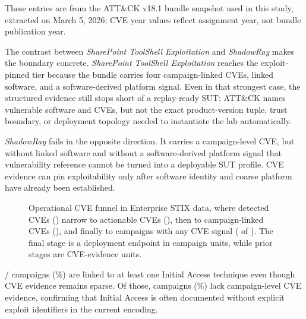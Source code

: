 \documentclass[sigconf]{acmart}
\begin{document}
These entries are from the ATT\&CK v18.1 bundle snapshot used in this study, extracted on March 5, 2026; CVE year values reflect assignment year, not bundle publication year.

The contrast between \emph{SharePoint ToolShell Exploitation} and \emph{ShadowRay} makes the boundary concrete. \emph{SharePoint ToolShell Exploitation} reaches the exploit-pinned tier because the bundle carries four campaign-linked CVEs, linked software, and a software-derived platform signal. Even in that strongest case, the structured evidence still stops short of a replay-ready SUT: ATT\&CK names vulnerable software and CVEs, but not the exact product-version tuple, trust boundary, or deployment topology needed to instantiate the lab automatically.

\emph{ShadowRay} fails in the opposite direction. It carries a campaign-level CVE, but without linked software and without a software-derived platform signal that vulnerability reference cannot be turned into a deployable SUT profile. CVE evidence can pin exploitability only after software identity and coarse platform have already been established.

\begin{figure}[!tb]
\centering
\resizebox{\columnwidth}{!}{}
\caption{Operational CVE funnel in Enterprise STIX data, where detected CVEs (\cveuniquecount{}) narrow to actionable CVEs (\cveactionablecount{}), then to campaign-linked CVEs (\campaignlinkedcvecount{}), and finally to campaigns with any CVE signal (\entcampaignswithcvecount{} of \enterpriseactivecampaigncount{}). The final stage is a deployment endpoint in campaign units, while prior stages are CVE-evidence units.}\label{fig:cve_location}
\end{figure}

\campaignswithinitialaccesscount{}/\enterpriseactivecampaigncount{} campaigns (\campaignswithinitialaccesspct\%) are linked to at least one Initial Access technique even though CVE evidence remains sparse. Of those, \campaignswithinitialaccessnocvecount{} campaigns (\campaignswithinitialaccessnocvepct\%) lack campaign-level CVE evidence, confirming that Initial Access is often documented without explicit exploit identifiers in the current encoding.
\end{document}
